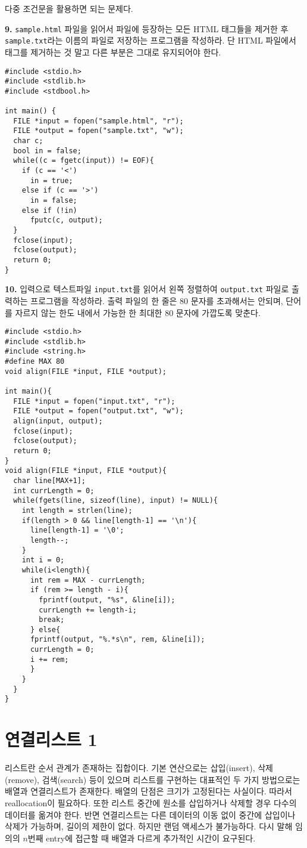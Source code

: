 \documentclass[a4paper,chapter,atbegshi]{oblivoir}
\begin{document}
다중 조건문을 활용하면 되는 문제다.
\hfill\break
\begin{mdframed}\textbf{9. }
  \texttt{sample.html} 파일을 읽어서 파일에 등장하는 모든 HTML 태그들을 제거한
  후 \texttt{sample.txt}라는 이름의 파일로 저장하는 프로그램을 작성하라. 
  단 HTML 파일에서 태그를 제거하는 것 말고 다른 부분은 그대로 유지되어야 한다.
\end{mdframed}
\begin{lstlisting}[style=C]
#include <stdio.h>
#include <stdlib.h>
#include <stdbool.h>

int main() {
  FILE *input = fopen("sample.html", "r");
  FILE *output = fopen("sample.txt", "w");
  char c;
  bool in = false; 
  while((c = fgetc(input)) != EOF){
    if (c == '<')
      in = true;
    else if (c == '>') 
      in = false;
    else if (!in) 
      fputc(c, output);
  }
  fclose(input);
  fclose(output);
  return 0;
}
\end{lstlisting}
\hfill\break
\begin{mdframed}\textbf{10. }
  입력으로 텍스트파일 \texttt{input.txt}를 읽어서 왼쪽 정렬하여 
  \texttt{output.txt} 파일로 출력하는 프로그램을 작성하라. 출력 파일의 한 줄은
  80 문자를 초과해서는 안되며, 단어를 자르지 않는 한도 내에서 가능한 한
  최대한 80 문자에 가깝도록 맞춘다.
\end{mdframed}
\begin{lstlisting}[style=C]
#include <stdio.h>
#include <stdlib.h>
#include <string.h>
#define MAX 80
void align(FILE *input, FILE *output);

int main(){
  FILE *input = fopen("input.txt", "r");
  FILE *output = fopen("output.txt", "w");
  align(input, output);
  fclose(input);
  fclose(output);
  return 0;
}
void align(FILE *input, FILE *output){
  char line[MAX+1]; 
  int currLength = 0;
  while(fgets(line, sizeof(line), input) != NULL){
    int length = strlen(line);
    if(length > 0 && line[length-1] == '\n'){
      line[length-1] = '\0';
      length--;
    }
    int i = 0;
    while(i<length){
      int rem = MAX - currLength;
      if (rem >= length - i){
        fprintf(output, "%s", &line[i]);
        currLength += length-i;
        break;
      } else{
      fprintf(output, "%.*s\n", rem, &line[i]);
      currLength = 0;
      i += rem;
      }
    }
  }
}
\end{lstlisting}
\chapter{연결리스트 1}
리스트란 순서 관계가 존재하는 집합이다. 기본 연산으로는 삽입(insert), 
삭제(remove), 검색(search) 등이 있으며 리스트를 구현하는 대표적인 두 가지
방법으로는 배열과 연결리스트가 존재한다. 배열의 단점은 크기가 고정된다는
사실이다. 따라서 reallocation이 필요하다. 또한 리스트 중간에 원소를 삽입하거나
삭제할 경우 다수의 데이터를 옮겨야 한다. 반면 연결리스트는 다른 데이터의 이동
없이 중간에 삽입이나 삭제가 가능하며, 길이의 제한이 없다. 하지만 랜덤 액세스가
불가능하다. 다시 말해 임의의 $n$번째 entry에 접근할 때 배열과 다르게 추가적인
시간이 요구된다.
\end{document}
